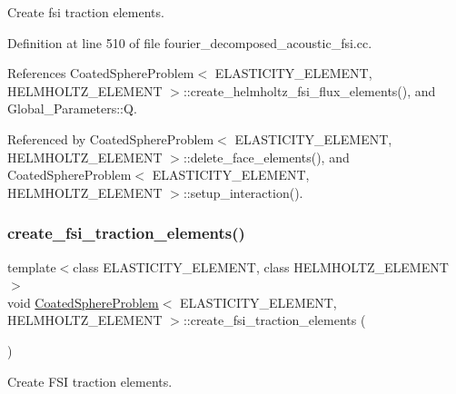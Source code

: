 Create fsi traction elements. 

Definition at line 510 of file fourier\+\_\+decomposed\+\_\+acoustic\+\_\+fsi.\+cc.



References Coated\+Sphere\+Problem$<$ E\+L\+A\+S\+T\+I\+C\+I\+T\+Y\+\_\+\+E\+L\+E\+M\+E\+N\+T, H\+E\+L\+M\+H\+O\+L\+T\+Z\+\_\+\+E\+L\+E\+M\+E\+N\+T $>$\+::create\+\_\+helmholtz\+\_\+fsi\+\_\+flux\+\_\+elements(), and Global\+\_\+\+Parameters\+::Q.



Referenced by Coated\+Sphere\+Problem$<$ E\+L\+A\+S\+T\+I\+C\+I\+T\+Y\+\_\+\+E\+L\+E\+M\+E\+N\+T, H\+E\+L\+M\+H\+O\+L\+T\+Z\+\_\+\+E\+L\+E\+M\+E\+N\+T $>$\+::delete\+\_\+face\+\_\+elements(), and Coated\+Sphere\+Problem$<$ E\+L\+A\+S\+T\+I\+C\+I\+T\+Y\+\_\+\+E\+L\+E\+M\+E\+N\+T, H\+E\+L\+M\+H\+O\+L\+T\+Z\+\_\+\+E\+L\+E\+M\+E\+N\+T $>$\+::setup\+\_\+interaction().

\mbox{\label{classCoatedSphereProblem_a2d342158b3058cd5392e2de3fd7595da}} 
\subsubsection{\texorpdfstring{create\+\_\+fsi\+\_\+traction\+\_\+elements()}{create\_fsi\_traction\_elements()}\hspace{0.1cm}{\footnotesize\ttfamily [2/2]}}
{\footnotesize\ttfamily template$<$class E\+L\+A\+S\+T\+I\+C\+I\+T\+Y\+\_\+\+E\+L\+E\+M\+E\+NT, class H\+E\+L\+M\+H\+O\+L\+T\+Z\+\_\+\+E\+L\+E\+M\+E\+NT$>$ \\
void \hyperlink{classCoatedSphereProblem}{Coated\+Sphere\+Problem}$<$ E\+L\+A\+S\+T\+I\+C\+I\+T\+Y\+\_\+\+E\+L\+E\+M\+E\+NT, H\+E\+L\+M\+H\+O\+L\+T\+Z\+\_\+\+E\+L\+E\+M\+E\+NT $>$\+::create\+\_\+fsi\+\_\+traction\+\_\+elements (\begin{DoxyParamCaption}{ }\end{DoxyParamCaption})\hspace{0.3cm}{\ttfamily [private]}}



Create F\+SI traction elements. 

\mbox{\label{classCoatedSphereProblem_a867f4ed706f00a73c87c2c862dcf19c3}} 

